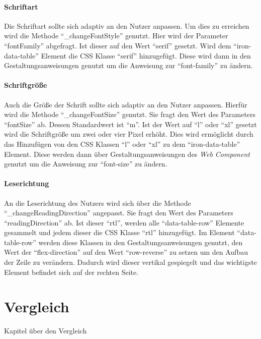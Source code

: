\documentclass[12pt, paper=a4, bibtotoc, toc=listof, headsepline=true]{scrreprt}
\begin{document}
		\subsubsection{Schriftart}
		Die Schriftart sollte sich adaptiv an den Nutzer anpassen. Um dies zu erreichen wird die Methode \enquote{\_changeFontStyle} genutzt. Hier wird der Parameter \enquote{fontFamily} abgefragt. Ist dieser auf den Wert \enquote{serif} gesetzt. Wird dem \enquote{iron-data-table} Element die CSS Klasse \enquote{serif} hinzugefügt. Diese wird dann in den Gestaltungsanweisungen genutzt um die Anweisung zur \enquote{font-family} zu ändern.
		\subsubsection{Schriftgröße}
		Auch die Größe der Schrift sollte sich adaptiv an den Nutzer anpassen. Hierfür wird die Methode \enquote{\_changeFontSize} genutzt. Sie fragt den Wert des Parameters \enquote{fontSize} ab. Dessen Standardwert ist \enquote{m}. Ist der Wert auf \enquote{l} oder \enquote{xl} gesetzt wird die Schriftgröße um zwei oder vier Pixel erhöht. Dies wird ermöglicht durch das Hinzufügen von den CSS Klassen \enquote{l} oder \enquote{xl} zu dem \enquote{iron-data-table} Element. Diese werden dann über Gestaltungsanweisungen des \emph{Web Component} genutzt um die Anweisung zur \enquote{font-size} zu ändern.
		\subsubsection{Leserichtung}
		An die Leserichtung des Nutzers wird sich über die Methode \enquote{\_changeReadingDirection} angepasst. Sie fragt den Wert des Parameters \enquote{readingDirection} ab. Ist dieser \enquote{rtl}, werden alle \enquote{data-table-row} Elemente gesammelt und jedem dieser die CSS Klasse \enquote{rtl} hinzugefügt. Im Element \enquote{data-table-row} werden diese Klassen in den Gestaltungsanweisungen genutzt, den Wert der \enquote{flex-direction} auf den Wert \enquote{row-reverse} zu setzen um den Aufbau der Zeile zu verändern. Dadurch wird dieser vertikal gespiegelt und das wichtigste Element befindet sich auf der rechten Seite.

\chapter{Vergleich}
Kapitel über den Vergleich
	

	\printbibliography
\end{document}
